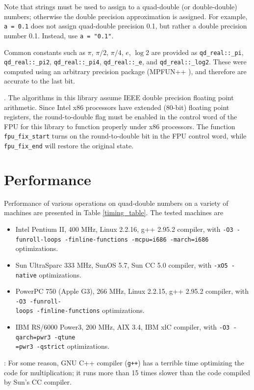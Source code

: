 \documentclass[11pt]{article}
\theoremstyle{definition}
\begin{document}
Note that strings must be used to assign to a quad-double (or double-double)
numbers; otherwise the double precision approximation is assigned.
For example, {\tt a = 0.1} does not assign quad-double precision 0.1, 
but rather a double precision number 0.1.  Instead, use {\tt a = "0.1"}.

Common constants such as $\pi$, $\pi/2$, $\pi/4$, $e$, $\log 2$ are
 provided as {\tt qd\_real::\_pi}, {\tt qd\_real::\_pi2}, 
{\tt qd\_real::\_pi4}, {\tt qd\_real::\_e}, and {\tt qd\_real::\_log2}.
These were computed using an arbitrary precision package (MPFUN++ 
\cite{cha98}), and therefore are accurate to the last bit.

.
The algorithms in this library assume IEEE double precision floating
point arithmetic.  Since Intel x86 processors have extended (80-bit)
floating point registers, the round-to-double flag must be enabled in
the control word of the FPU for this library to function properly
under x86 processors.  The function {\tt fpu\_fix\_start} turns
on the round-to-double bit in the FPU control word, while 
{\tt fpu\_fix\_end} will restore the original state.

\section{Performance} \label{sec:performance}
Performance of various operations on quad-double numbers on a variety
of machines are presented in Table \ref{timing_table}.  The tested
machines are
\begin{itemize}
\item Intel Pentium II, 400 MHz, Linux 2.2.16, g++ 2.95.2 compiler, 
  with {\tt -O3 -funroll-loops -finline-functions -mcpu=i686 -march=i686} 
  optimizations.
\item Sun UltraSparc 333 MHz, SunOS 5.7, Sun CC 5.0 compiler, 
  with {\tt -xO5 -native} optimizations.
\item PowerPC 750 (Apple G3), 266 MHz, Linux 2.2.15, g++ 2.95.2 compiler, 
  with {\tt -O3 -funroll-\\loops -finline-functions} optimizations.
\item IBM RS/6000 Power3, 200 MHz, AIX 3.4, IBM xlC compiler, 
  with {\tt -O3 -qarch=pwr3 -qtune\\=pwr3 -qstrict} optimizations.
\end{itemize}

: For some reason, GNU C++ compiler ({\tt g++}) has
a terrible time optimizing the code for multiplication; it runs more than
15 times slower than the code compiled by Sun's CC compiler.
\end{document}
